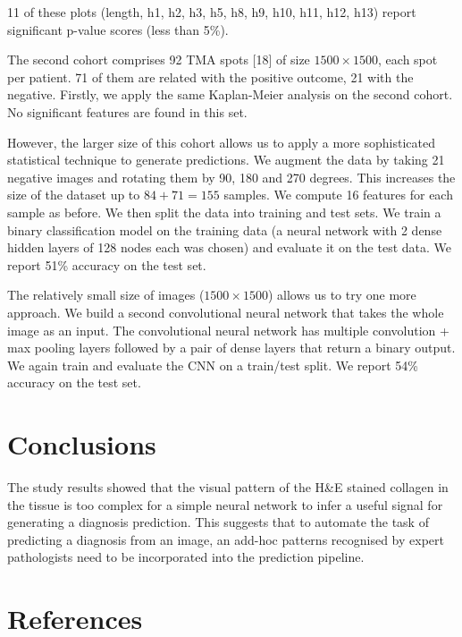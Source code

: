 \documentclass{article}
\begin{document}
11 of these plots (length, h1, h2, h3, h5, h8, h9, h10, h11, h12, h13) report significant
p-value scores (less than 5\%).

The second cohort comprises 92 TMA spots [18] of size $1500 \times 1500$, each spot per patient.
71 of them are related with the positive outcome, 21 with the negative. Firstly, we apply the
same Kaplan-Meier analysis on the second cohort. No significant features are found in this set.

However, the larger size of this cohort allows us to apply a more sophisticated statistical
technique to generate predictions. We augment the data by taking 21 negative images and rotating
them by 90, 180 and 270 degrees. This increases the size of the dataset up to $84+71=155$ samples.
We compute 16 features for each sample as before. We then split the data into training and test
sets. We train a binary classification model on the training data (a neural network with 2 dense
hidden layers of 128 nodes each was chosen) and evaluate it on the test data. We report 51\%
accuracy on the test set.

The relatively small size of images ($1500 \times 1500$) allows us to try one more approach. We
build a second convolutional neural network that takes the whole image as an input. The
convolutional neural network has multiple convolution + max pooling layers followed by a pair of dense layers that return a binary output. We again train and evaluate the CNN on a train/test split.
We report 54\% accuracy on the test set. 

\section{Conclusions}

    The study results showed that the visual pattern of the H\&E stained collagen
    in the tissue is too complex for a simple neural network to infer a useful signal
    for generating a diagnosis prediction. This suggests that to automate the task of predicting
    a diagnosis from an image, an add-hoc patterns recognised by expert pathologists need to be
    incorporated into the prediction pipeline.

\section{References}
\end{document}
